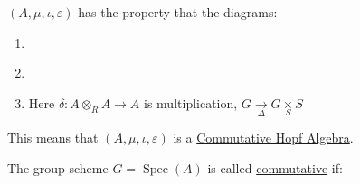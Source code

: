 \documentclass{article}
\theoremstyle{definition}
\numberwithin{theorem}{subsection}
\begin{document}
    \((A,\mu , \iota , \varepsilon)\) has the property that the diagrams:
    
    \begin{enumerate}[label=\arabic*')]
        \item  
        
        \begin{center}
        \end{center}

        \item

        \begin{center}
        \end{center}
        
        \item 

        \begin{center}
        \end{center}

        Here \(\delta: A \otimes_R A \to A\) is multiplication, \(G \xrightarrow[\Delta]{} G \underset{S}{\times} S\) 

    \end{enumerate} 

    This means that \((A,\mu, \iota, \varepsilon)\) is a \underline{Commutative Hopf Algebra}.
    
    The group scheme \(G = \operatorname{Spec}(A)\) is called \underline{commutative} if:
\end{document}
